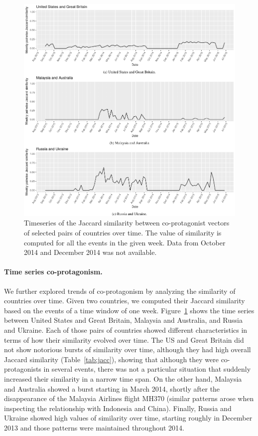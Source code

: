 \begin{figure}
    \centering
    \includegraphics[width=\textwidth]{figures/geopolitical/jaccard_time.pdf}
    \caption[Timeseries of the Jaccard similarity between co-protagonist
  vectors]{Timeseries of the Jaccard similarity between co-protagonist vectors
  of selected pairs of countries over time. The value of similarity is computed
  for all the events in the given week. Data from October 2014 and December 2014
  was not available.}\label{fig:time-series}
\end{figure}

\paragraph{Time series co-protagonism.}
We further explored trends of co-protagonism by analyzing the similarity of
countries over time. 
%
Given two countries, we computed their Jaccard similarity based on the events of
a time window of one week. 
%
Figure~\ref{fig:time-series} shows the time series between United States and
Great Britain, Malaysia and Australia, and Russia and Ukraine. 
%
Each of those pairs of countries showed different characteristics in terms of
how their similarity evolved over time. 
%
The US and Great Britain did not show notorious bursts of similarity over time,
although they had high overall Jaccard similarity (Table~\ref{tab:jacc}),
showing that although they were co-protagonists in several events, there was not
a particular situation that suddenly increased their similarity in a narrow time
span. 
%
On the other hand, Malaysia and Australia showed a burst starting in March 2014,
shortly after the disappearance of the Malaysia Airlines flight MH370 (similar
patterns arose when inspecting the relationship with Indonesia and China).
%
Finally, Russia and Ukraine showed high values of similarity over time, starting
roughly in December 2013 and those patterns were maintained throughout 2014.\\


